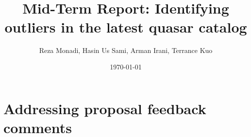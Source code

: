 \documentclass[usenatbib,a4paper,fleqn]{article}
\title{Mid-Term Report: Identifying outliers in the latest quasar catalog}
\author{Reza Monadi, Hasin Us Sami,
Arman Irani, Terrance Kuo}
\date{\today}
\begin{document}
\maketitle


\section*{Addressing proposal feedback comments}
\end{document}
